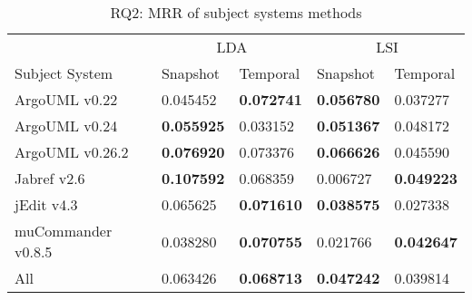 \begin{table}[t]
\renewcommand{\arraystretch}{1.3}
\centering
\caption{RQ2: MRR of subject systems methods}
\begin{tabular}{l|ll|ll}
    \toprule
                        & \multicolumn{2}{c|}{LDA}      &  \multicolumn{2}{c}{LSI}  \\
    Subject System      & Snapshot      & Temporal      & Snapshot      & Temporal  \\
    \midrule
ArgoUML v0.22 & 0.045452 & {\bf 0.072741 } & {\bf 0.056780 } & 0.037277 \\
ArgoUML v0.24 & {\bf 0.055925 } & 0.033152 & {\bf 0.051367 } & 0.048172 \\
ArgoUML v0.26.2 & {\bf 0.076920 } & 0.073376 & {\bf 0.066626 } & 0.045590 \\
Jabref v2.6 & {\bf 0.107592 } & 0.068359 & 0.006727 & {\bf 0.049223 } \\
jEdit v4.3 & 0.065625 & {\bf 0.071610 } & {\bf 0.038575 } & 0.027338 \\
muCommander v0.8.5 & 0.038280 & {\bf 0.070755 } & 0.021766 & {\bf 0.042647 } \\
    \midrule
All & 0.063426 & {\bf 0.068713 } & {\bf 0.047242 } & 0.039814 \\
    \bottomrule
\end{tabular}
\label{table:rq2:methods}
\end{table}


